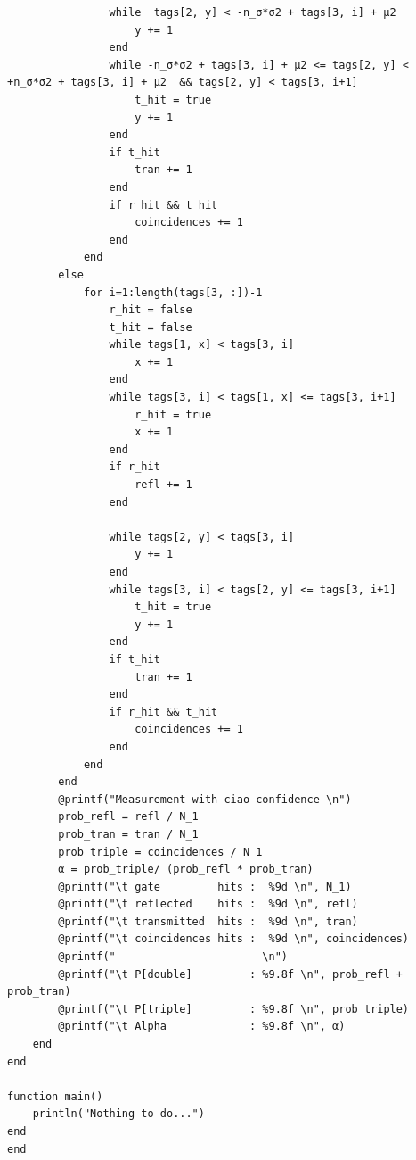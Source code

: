 \documentclass[10pt, final]{article}
\begin{document}
\begin{mdframed}
\begin{lstlisting}
                while  tags[2, y] < -n_σ*σ2 + tags[3, i] + μ2 
                    y += 1
                end
                while -n_σ*σ2 + tags[3, i] + μ2 <= tags[2, y] < +n_σ*σ2 + tags[3, i] + μ2  && tags[2, y] < tags[3, i+1]
                    t_hit = true
                    y += 1
                end
                if t_hit
                    tran += 1
                end
                if r_hit && t_hit
                    coincidences += 1
                end
            end
        else
            for i=1:length(tags[3, :])-1
                r_hit = false
                t_hit = false 
                while tags[1, x] < tags[3, i]
                    x += 1
                end
                while tags[3, i] < tags[1, x] <= tags[3, i+1] 
                    r_hit = true
                    x += 1
                end
                if r_hit
                    refl += 1
                end

                while tags[2, y] < tags[3, i]
                    y += 1
                end
                while tags[3, i] < tags[2, y] <= tags[3, i+1]
                    t_hit = true
                    y += 1
                end
                if t_hit
                    tran += 1
                end
                if r_hit && t_hit
                    coincidences += 1
                end
            end
        end
        @printf("Measurement with ciao confidence \n")
        prob_refl = refl / N_1
        prob_tran = tran / N_1
        prob_triple = coincidences / N_1
        α = prob_triple/ (prob_refl * prob_tran)
        @printf("\t gate         hits :  %9d \n", N_1)
        @printf("\t reflected    hits :  %9d \n", refl)
        @printf("\t transmitted  hits :  %9d \n", tran)
        @printf("\t coincidences hits :  %9d \n", coincidences)
        @printf(" ----------------------\n")
        @printf("\t P[double]         : %9.8f \n", prob_refl + prob_tran)
        @printf("\t P[triple]         : %9.8f \n", prob_triple)
        @printf("\t Alpha             : %9.8f \n", α)
    end
end

function main()
    println("Nothing to do...")
end
end
  \end{lstlisting}
\end{mdframed}
\end{document}
